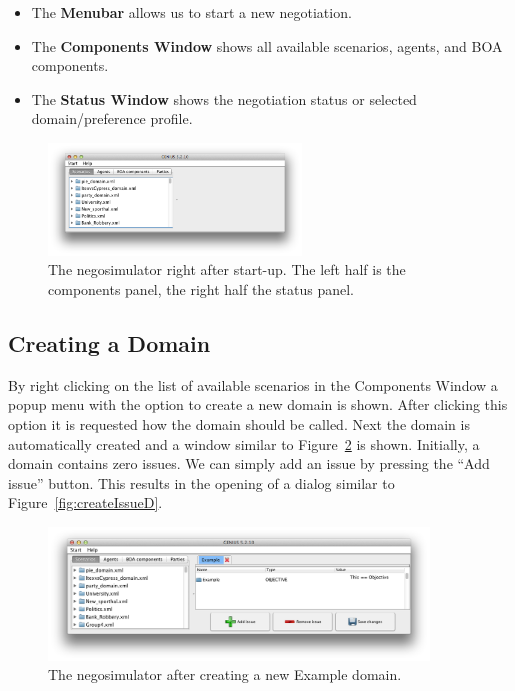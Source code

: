\documentclass[]{article}
\begin{document}
\begin{itemize}
	\item The \textbf{Menubar} allows us to start a new negotiation.
	\item The \textbf{Components Window} shows all available scenarios, agents, and BOA components.
	\item The \textbf{Status Window} shows the negotiation status or selected domain/preference profile.
\end{itemize}

\begin{figure}[htb]
	\centering
	\includegraphics[width=0.6\textwidth]{media/start.png}
\caption{The negosimulator right after start-up. The left half is the components panel, the right half the status panel.}\label{Fig:negosimulator start}
\end{figure}

\subsection{Creating a Domain}
By right clicking on the list of available scenarios in the Components Window a popup menu with the option to create a new domain is shown. After clicking this option it is requested how the domain should be called. Next the domain is automatically created and a window similar to Figure~\ref{Fig:newdomain} is shown. Initially, a domain contains zero issues. We can simply add an issue by pressing the ``Add issue'' button. This results in the opening of a dialog similar to Figure~\ref{fig:createIssueD}.

\begin{figure}[htb]
	\centering
	\includegraphics[width=0.9\textwidth]{media/exampledomain.png}
\caption{The negosimulator after creating a new Example domain.}\label{Fig:newdomain}
\end{figure}
\end{document}
